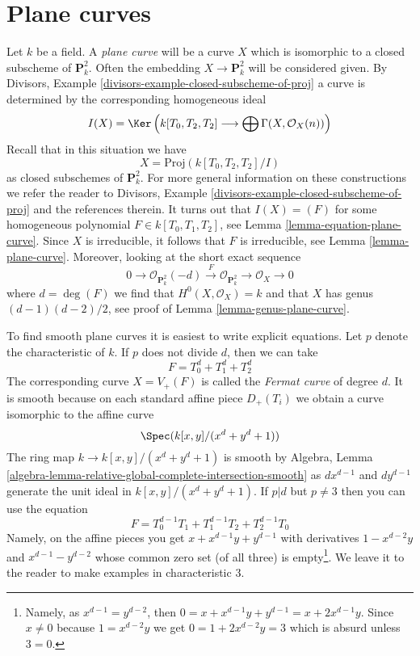 \section{Plane curves}
\label{section-plane-curves}

\noindent
Let $k$ be a field. A {\it plane curve} will be a curve $X$ which is isomorphic
to a closed subscheme of $\mathbf{P}^2_k$. Often the embedding
$X \to \mathbf{P}^2_k$ will be considered given. By
Divisors, Example \ref{divisors-example-closed-subscheme-of-proj}
a curve is determined by the corresponding homogeneous ideal
$$
I(X) =
\Ker\left(
k[T_0, T_2, T_2] \longrightarrow \bigoplus \Gamma(X, \mathcal{O}_X(n))
\right)
$$
Recall that in this situation we have
$$
X = \text{Proj}(k[T_0, T_2, T_2]/I)
$$
as closed subschemes of $\mathbf{P}^2_k$.
For more general information on these constructions we refer the
reader to Divisors, Example \ref{divisors-example-closed-subscheme-of-proj}
and the references therein.
It turns out that $I(X) = (F)$ for some homogeneous polynomial
$F \in k[T_0, T_1, T_2]$, see Lemma \ref{lemma-equation-plane-curve}.
Since $X$ is irreducible, it follows that $F$ is irreducible, see
Lemma \ref{lemma-plane-curve}. Moreover, looking at the short exact
sequence
$$
0 \to \mathcal{O}_{\mathbf{P}^2_k}(-d) \xrightarrow{F}
\mathcal{O}_{\mathbf{P}^2_k} \to \mathcal{O}_X \to 0
$$
where $d = \deg(F)$ we find that $H^0(X, \mathcal{O}_X) = k$ and that $X$
has genus $(d - 1)(d - 2)/2$, see proof of Lemma \ref{lemma-genus-plane-curve}.

\medskip\noindent
To find smooth plane curves it is easiest to write explicit
equations. Let $p$ denote the characteristic of $k$. If $p$
does not divide $d$, then we can take
$$
F = T_0^d + T_1^d + T_2^d
$$
The corresponding curve $X = V_+(F)$ is called the
{\it Fermat curve} of degree $d$. It is smooth because
on each standard affine piece $D_+(T_i)$ we obtain
a curve isomorphic to the affine curve
$$
\Spec(k[x, y]/(x^d + y^d + 1))
$$
The ring map $k \to k[x, y]/(x^d + y^d + 1)$ is smooth by
Algebra, Lemma \ref{algebra-lemma-relative-global-complete-intersection-smooth}
as $d x^{d - 1}$ and $d y^{d - 1}$ generate the unit ideal
in $k[x, y]/(x^d + y^d + 1)$. If $p | d$ but $p \not = 3$
then you can use the equation
$$
F = T_0^{d - 1}T_1 + T_1^{d - 1}T_2 + T_2^{d - 1}T_0
$$
Namely, on the affine pieces you get $x + x^{d - 1}y + y^{d - 1}$
with derivatives $1 - x^{d - 2}y$ and $x^{d - 1} - y^{d - 2}$
whose common zero set (of all three) is empty\footnote{Namely,
as $x^{d - 1} = y^{d - 2}$, then $0 = x + x^{d - 1}y + y^{d - 1} =
x + 2 x^{d - 1} y$. Since $x \not = 0$ because $1 = x^{d - 2}y$
we get $0 = 1 + 2x^{d - 2}y = 3$ which is absurd unless $3 = 0$.}.
We leave it to the reader to make examples in characteristic $3$.

